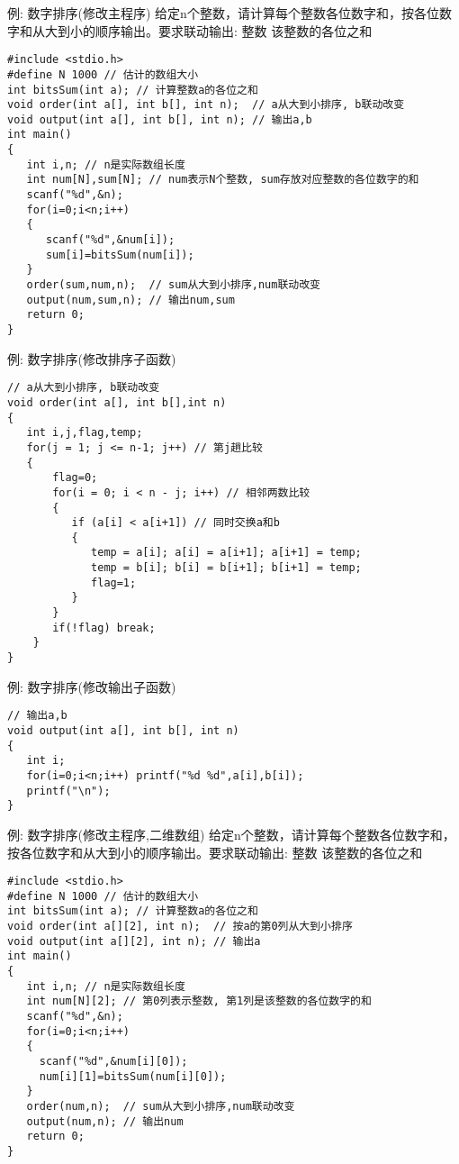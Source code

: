 \begin{frame}{例: 数字排序(修改主程序)}
给定n个整数，请计算每个整数各位数字和，按各位数字和从大到小的顺序输出。要求联动输出: 整数 该整数的各位之和
\begin{lstlisting}
#include <stdio.h>
#define N 1000 // 估计的数组大小
int bitsSum(int a); // 计算整数a的各位之和
void order(int a[], int b[], int n);  // a从大到小排序, b联动改变
void output(int a[], int b[], int n); // 输出a,b
int main()
{
   int i,n; // n是实际数组长度 
   int num[N],sum[N]; // num表示N个整数, sum存放对应整数的各位数字的和  
   scanf("%d",&n);
   for(i=0;i<n;i++) 
   {
      scanf("%d",&num[i]); 
      sum[i]=bitsSum(num[i]);
   }
   order(sum,num,n);  // sum从大到小排序,num联动改变
   output(num,sum,n); // 输出num,sum
   return 0;
}
\end{lstlisting}
\end{frame}

\begin{frame}{例: 数字排序(修改排序子函数)}
\begin{lstlisting}
// a从大到小排序, b联动改变
void order(int a[], int b[],int n)
{
   int i,j,flag,temp;
   for(j = 1; j <= n-1; j++) // 第j趟比较
   {
       flag=0;
       for(i = 0; i < n - j; i++) // 相邻两数比较
       {
          if (a[i] < a[i+1]) // 同时交换a和b
          { 
             temp = a[i]; a[i] = a[i+1]; a[i+1] = temp; 
             temp = b[i]; b[i] = b[i+1]; b[i+1] = temp; 
             flag=1;
          }
       }
       if(!flag) break;
    }
}
\end{lstlisting}
\end{frame}

\begin{frame}{例: 数字排序(修改输出子函数)}
\begin{lstlisting}
// 输出a,b
void output(int a[], int b[], int n)
{
   int i;
   for(i=0;i<n;i++) printf("%d %d",a[i],b[i]);
   printf("\n");
}
\end{lstlisting}
\end{frame}

\begin{frame}{例: 数字排序(修改主程序,二维数组)}
给定n个整数，请计算每个整数各位数字和，按各位数字和从大到小的顺序输出。要求联动输出: 整数 该整数的各位之和
\begin{lstlisting}
#include <stdio.h>
#define N 1000 // 估计的数组大小
int bitsSum(int a); // 计算整数a的各位之和
void order(int a[][2], int n);  // 按a的第0列从大到小排序
void output(int a[][2], int n); // 输出a
int main()
{
   int i,n; // n是实际数组长度 
   int num[N][2]; // 第0列表示整数, 第1列是该整数的各位数字的和  
   scanf("%d",&n);
   for(i=0;i<n;i++) 
   {
     scanf("%d",&num[i][0]); 
     num[i][1]=bitsSum(num[i][0]);
   }
   order(num,n);  // sum从大到小排序,num联动改变
   output(num,n); // 输出num
   return 0;
}
\end{lstlisting}
\end{frame}

